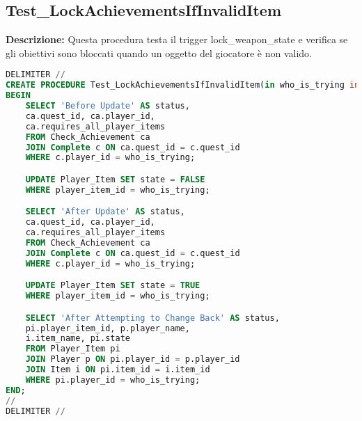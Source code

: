 \documentclass{article}
\begin{document}
\subsection*{Test\_LockAchievementsIfInvalidItem}

\textbf{Descrizione:} Questa procedura testa il trigger lock\_weapon\_state e verifica se gli obiettivi sono bloccati quando un oggetto del giocatore è non valido.

\begin{lstlisting}[language=SQL]
DELIMITER //
CREATE PROCEDURE Test_LockAchievementsIfInvalidItem(in who_is_trying int)
BEGIN
    SELECT 'Before Update' AS status,
    ca.quest_id, ca.player_id,
    ca.requires_all_player_items
    FROM Check_Achievement ca
    JOIN Complete c ON ca.quest_id = c.quest_id
    WHERE c.player_id = who_is_trying;

    UPDATE Player_Item SET state = FALSE
    WHERE player_item_id = who_is_trying;

    SELECT 'After Update' AS status,
    ca.quest_id, ca.player_id,
    ca.requires_all_player_items
    FROM Check_Achievement ca
    JOIN Complete c ON ca.quest_id = c.quest_id
    WHERE c.player_id = who_is_trying;

    UPDATE Player_Item SET state = TRUE
    WHERE player_item_id = who_is_trying;

    SELECT 'After Attempting to Change Back' AS status,
    pi.player_item_id, p.player_name,
    i.item_name, pi.state
    FROM Player_Item pi
    JOIN Player p ON pi.player_id = p.player_id
    JOIN Item i ON pi.item_id = i.item_id
    WHERE pi.player_id = who_is_trying;
END;
//
DELIMITER //
\end{lstlisting}
\end{document}
